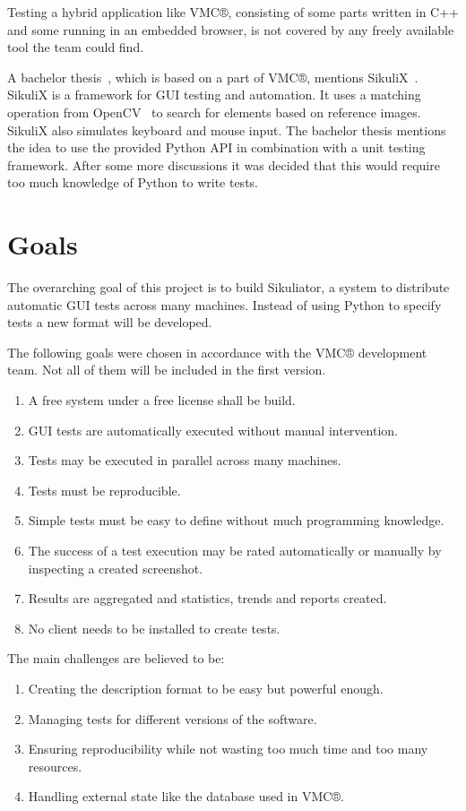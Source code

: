 \documentclass[a4paper,twocolumn]{article}
\newcommand{\VMC}[0]{VMC®}
\newcommand{\Sik}[0]{Sikuliator}
\begin{document}
Testing a hybrid application like \VMC{}, consisting of some parts written in C++ and some running in an embedded browser, is not covered by any freely available tool the team could find.

A bachelor thesis~\cite{BachelorMapViewer}, which is based on a part of \VMC{}, mentions SikuliX~\cite{SikuliX}.
SikuliX is a framework for GUI testing and automation.
It uses a matching operation from OpenCV~\cite{OpenCV} to search for elements based on reference images.
SikuliX also simulates keyboard and mouse input.
The bachelor thesis mentions the idea to use the provided Python API in combination with a unit testing framework.
After some more discussions it was decided that this would require too much knowledge of Python to write tests.

\section{Goals}
The overarching goal of this project is to build \Sik{}, a system to distribute automatic GUI tests across many machines.
Instead of using Python to specify tests a new format will be developed.


The following goals were chosen in accordance with the \VMC{} development team.
Not all of them will be included in the first version.
\begin{enumerate}
	\item A free system under a free license shall be build.
	\item GUI tests are automatically executed without manual intervention.
	\item Tests may be executed in parallel across many machines.
	\item Tests must be reproducible.
	\item Simple tests must be easy to define without much programming knowledge.
	\item The success of a test execution may be rated automatically or manually by inspecting a created screenshot.
	\item Results are aggregated and statistics, trends and reports created.
	\item No client needs to be installed to create tests.
\end{enumerate}



The main challenges are believed to be:
\begin{enumerate}
	\item Creating the description format to be easy but powerful enough.
	\item Managing tests for different versions of the software.
	\item Ensuring reproducibility while not wasting too much time and too many resources.
	\item Handling external state like the database used in \VMC{}.
\end{enumerate}
\end{document}
